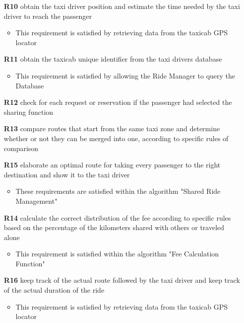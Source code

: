\begin{itemize}
	\item [\textbf{R10}] obtain the taxi driver position and estimate the time needed by the taxi driver to reach the passenger
	\begin{itemize}
		\item This requirement is satisfied by retrieving data from the taxicab GPS locator 
	\end{itemize}
	
	\item [\textbf{R11}] obtain the taxicab unique identifier from the taxi drivers database
	\begin{itemize}
		\item This requirement is satisfied by allowing the Ride Manager to query the Database
	\end{itemize}
	
	\item [\textbf{R12}] check for each request or reservation if the passenger had selected the sharing function
	\item [\textbf{R13}] compare routes that start from the same taxi zone and determine whether or not they can be merged into one, according to specific rules of comparison
	\item [\textbf{R15}] elaborate an optimal route for taking every passenger to the right destination and show it to the taxi driver
	\begin{itemize}
		\item These requirements are satisfied within the algorithm "Shared Ride Management"
	\end{itemize}
	
	\item [\textbf{R14}] calculate the correct distribution of the fee according to specific rules based on the percentage of the kilometers shared with others or traveled alone
	\begin{itemize}
		\item This requirement is satisfied within the algorithm "Fee Calculation Function"
	\end{itemize}
	
	\item [\textbf{R16}] keep track of the actual route followed by the taxi driver and keep track of the actual duration of the ride
	\begin{itemize}
		\item This requirement is satisfied by retrieving data from the taxicab GPS locator
	\end{itemize}
	

\end{itemize}
